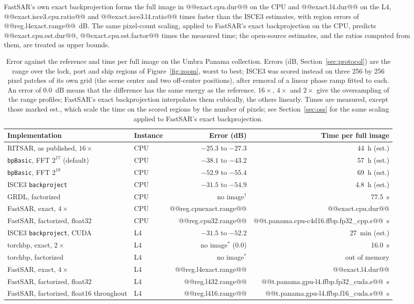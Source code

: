 \documentclass[11pt]{article}
\begin{document}
FastSAR's own exact backprojection forms the full image in @@exact.cpu.dur@@ on the CPU and @@exact.l4.dur@@ on the L4, @@exact.isce3.cpu.ratio@@ and @@exact.isce3.l4.ratio@@ times faster than the ISCE3 estimates, with region errors of @@reg.l4exact.range@@~dB. The same pixel-count scaling, applied to FastSAR's exact backprojection on the CPU, predicts @@exact.cpu.est.dur@@, @@exact.cpu.est.factor@@ times the measured time; the open-source estimates, and the ratios computed from them, are treated as upper bounds.

\begin{table}[tb]
\centering
\caption{Error against the reference and time per full image on the Umbra Panama collection. Errors (dB, Section~\ref{sec:protocol}) are the range over the lock, port and ship regions of Figure~\ref{fig:zoom}, worst to best; ISCE3 was scored instead on three 256 by 256 pixel patches of its own grid (the scene center and two off-center positions), after removal of a linear phase ramp fitted to each. An error of 0.0~dB means that the difference has the same energy as the reference. $16\times$, $4\times$ and $2\times$ give the oversampling of the range profiles; FastSAR's exact backprojection interpolates them cubically, the others linearly. Times are measured, except those marked est., which scale the time on the scored regions by the number of pixels; see Section~\ref{sec:oss} for the same scaling applied to FastSAR's exact backprojection.}
\label{tab:oss}
\small
\begin{tabular}{llrr}
\toprule
Implementation & Instance & Error (dB) & Time per full image \\
\midrule
RITSAR, as published, $16\times$ & CPU & $-25.3$ to $-27.3$ & 44~h (est.) \\
\texttt{bpBasic}, FFT $2^{17}$ (default) & CPU & $-38.1$ to $-43.2$ & 57~h (est.) \\
\texttt{bpBasic}, FFT $2^{18}$ & CPU & $-52.9$ to $-55.4$ & 69~h (est.) \\
ISCE3 \texttt{backproject} & CPU & $-31.5$ to $-54.9$ & 4.8~h (est.) \\
GRDL, factorized & CPU & no image$^\dagger$ & 77.5~s \\
FastSAR, exact, $4\times$ & CPU & @@reg.cpuexact.range@@ & @@exact.cpu.dur@@ \\
FastSAR, factorized, float32 & CPU & @@reg.cpu32.range@@ & @@t.panama.cpu-c4d16.ffbp.fp32_cpp.s@@~s \\
\midrule
ISCE3 \texttt{backproject}, CUDA & L4 & $-31.5$ to $-52.2$ & 27~min (est.) \\
torchbp, exact, $2\times$ & L4 & no image$^*$ ($0.0$) & 16.0~s \\
torchbp, factorized & L4 & no image$^*$ & out of memory \\
FastSAR, exact, $4\times$ & L4 & @@reg.l4exact.range@@ & @@exact.l4.dur@@ \\
FastSAR, factorized, float32 & L4 & @@reg.l432.range@@ & @@t.panama.gpu-l4.ffbp.fp32_cuda.s@@~s \\
FastSAR, factorized, float16 throughout & L4 & @@reg.l416.range@@ & @@t.panama.gpu-l4.ffbp.f16_cuda.s@@~s \\
\bottomrule
\end{tabular}


\end{table}
\end{document}
